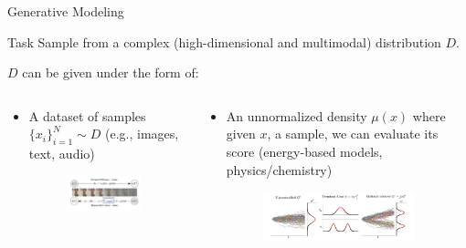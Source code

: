 \documentclass[aspectratio=169,xcolor=dvipsnames]{beamer}
\begin{document}
\begin{frame}[t]{Generative Modeling}
\scriptsize
\begin{block}{Task}
    Sample from a complex (high-dimensional and multimodal) distribution $D$.
\end{block}

$D$ can be given under the form of:

\begin{columns}[t]
\begin{column}{0.48\textwidth}
\begin{itemize}\itemsep2pt
    \item A dataset of samples $\{x_i\}_{i=1}^N \sim D$ (e.g., images, text, audio)
    \begin{figure}
        \centering
        \includegraphics[width=0.9\textwidth]{figures/score_diffusion.png}
    \end{figure}
\end{itemize}
\end{column}
\begin{column}{0.48\textwidth}
\begin{itemize}\itemsep2pt
    \item An unnormalized density $\mu(x)$ where given $x$, a sample, we can evaluate its score (energy-based models, physics/chemistry)
    \begin{figure}
        \centering
        \includegraphics[width=0.9\textwidth]{figures/unconctrolled.png}
    \end{figure}
\end{itemize}
\end{column}
\end{columns}

\end{frame}
\end{document}
